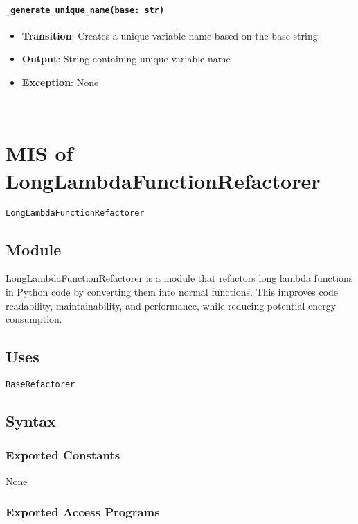 \documentclass[12pt, titlepage]{article}
\begin{document}
\paragraph{\texttt{\_generate\_unique\_name(base: str)}}
\begin{itemize}
  \item \textbf{Transition}: Creates a unique variable name based on the base string
  \item \textbf{Output}: String containing unique variable name
  \item \textbf{Exception}: None
\end{itemize}

~\newpage

\section{MIS of LongLambdaFunctionRefactorer} \label{mis:LLF}

\texttt{LongLambdaFunctionRefactorer}

\subsection{Module}
LongLambdaFunctionRefactorer is a module that refactors 
long lambda functions in Python code by converting them into normal functions. 
This improves code readability, maintainability, and performance, while reducing potential energy consumption.

\subsection{Uses}

\texttt{BaseRefactorer}

\subsection{Syntax}

\subsubsection{Exported Constants}
None

\subsubsection{Exported Access Programs}
\end{document}
